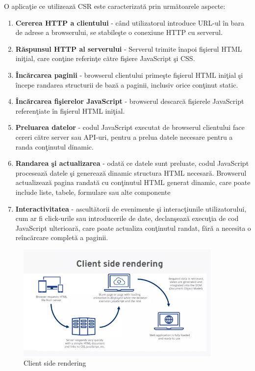 \documentclass[12pt, a4paper]{report}
\begin{document}
O aplica\c tie ce utilizeaz\u a CSR este caracterizat\u a prin urm\u atoarele aspecte:
\begin{enumerate}
	\item \textbf{Cererea HTTP a clientului} - c\^and utilizatorul introduce URL-ul \^in bara de adrese a browserului, se stabile\c ste o conexiune HTTP cu serverul.
	\item \textbf{R\u aspunsul HTTP al serverului} - Serverul trimite \^inapoi fi\c sierul HTML ini\c tial, care con\c tine referin\c te c\u atre fi\c siere JavaScript \c si CSS.
	\item \textbf{\^Inc\u arcarea paginii} - browserul clientului prime\c ste fi\c sierul HTML ini\c tial \c si \^incepe randarea structurii de baz\u a a paginii, inclusiv orice con\c tinut static.
	\item \textbf{\^Inc\u arcarea fi\c sierelor JavaScript} - browserul descarc\u a fi\c sierele JavaScript referen\c tiate \^in fi\c sierul HTML ini\c tial.
	\item \textbf{Preluarea datelor} - codul JavaScript executat de browserul clientului face cereri c\u atre server sau API-uri, pentru a prelua datele necesare pentru a randa con\c tinutul dinamic.
	\item \textbf{Randarea \c si actualizarea} - odat\u a ce datele sunt preluate, codul JavaScript proceseaz\u a datele \c si genereaz\u a dinamic structura HTML necesar\u a. Browserul actualizeaz\u a pagina randat\u a cu con\c tinutul HTML generat dinamic, care poate include liste, tabele, formulare sau alte componente
	\item \textbf{Interactivitatea} - ascult\u atorii de evenimente \c si interac\c tiunile utilizatorului, cum ar fi click-urile sau introducerile de date, declan\c seaz\u a execu\c tia de cod JavaScript ulterioar\u a, care poate actualiza con\c tinutul randat, f\u ar\u a a necesita o re\^inc\u arcare complet\u a a paginii.
\end{enumerate}
\newpage
\begin{figure}[htbp]
	\centering
	\includegraphics[width=0.9\textwidth]{csr-diagram.png}
	\caption{Client side rendering \protect\footnotemark}
	\label{fig:csr-diagram}
\end{figure}
\end{document}
